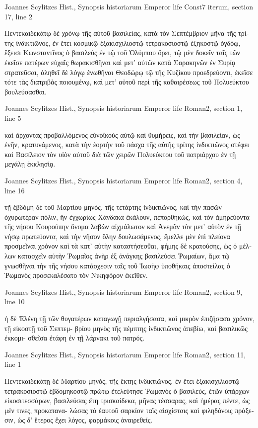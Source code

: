 \documentclass[12pt,letterpaper,twoside,final]{memoir}
\begin{document}
\begin{greek}
Joannes Scylitzes Hist., Synopsis historiarum 
Emperor life Const7 iterum, section 17, line 2

Πεντεκαιδεκάτῳ δὲ χρόνῳ τῆς αὐτοῦ βασιλείας, κατὰ τὸν 
Σεπτέμβριον μῆνα τῆς τρίτης ἰνδικτιῶνος, ἐν ἔτει κοσμικῷ ἑξακισχιλιοστῷ   
τετρακοσιοστῷ ἑξηκοστῷ ὀγδόῳ, ἔξεισι Κωνσταντῖνος ὁ βασιλεὺς ἐν 
τῷ τοῦ Ὀλύμπου ὄρει, τῷ μὲν δοκεῖν ταῖς τῶν ἐκεῖσε πατέρων εὐχαῖς 
θωρακισθῆναι καὶ μετ' αὐτῶν κατὰ Σαρακηνῶν ἐν Συρίᾳ στρατεῦσαι, 
ἀληθεῖ δὲ λόγῳ ἑνωθῆναι Θεοδώρῳ τῷ τῆς Κυζίκου προεδρεύοντι, 
ἐκεῖσε τότε τὰς διατριβὰς ποιουμένῳ, καὶ μετ' αὐτοῦ περὶ τῆς καθαιρέσεως 
τοῦ Πολυεύκτου βουλεύσασθαι. 



Joannes Scylitzes Hist., Synopsis historiarum 
Emperor life Roman2, section 1, line 5

καὶ ἄρχοντας προβαλλόμενος εὐνοϊκοὺς αὐτῷ καὶ θυμήρεις, καὶ τὴν 
βασιλείαν, ὡς ἐνῆν, κρατυνάμενος, κατὰ τὴν ἑορτὴν τοῦ πάσχα τῆς αὐτῆς 
τρίτης ἰνδικτιῶνος στέφει καὶ Βασίλειον τὸν υἱὸν αὐτοῦ διὰ τῶν χειρῶν 
Πολυεύκτου τοῦ πατριάρχου ἐν τῇ μεγάλῃ ἐκκλησίᾳ. 



Joannes Scylitzes Hist., Synopsis historiarum 
Emperor life Roman2, section 4, line 16

              τῇ ἑβδόμῃ δὲ τοῦ Μαρτίου μηνός, τῆς τετάρτης ἰνδικτιῶνος, 
καὶ τὴν πασῶν ὀχυρωτέραν πόλιν, ἣν ἐγχωρίως Χάνδακα ἐκάλουν, 
πεπορθηκώς, καὶ τὸν ἀμηρεύοντα τῆς νήσου Κουρούπην ὄνομα λαβὼν   
αἰχμάλωτον καὶ Ἀνεμᾶν τὸν μετ' αὐτὸν ἐν τῇ νήσῳ πρωτεύοντα, καὶ τὴν 
νῆσον ὅλην δουλωσάμενος, ἔμελλε μὲν ἐπὶ πλείονα προσμεῖναι χρόνον καὶ 
τὰ κατ' αὐτὴν καταστήσεσθαι, φήμης δὲ κρατούσης, ὡς ὁ μέλλων 
κατασχεῖν αὐτὴν Ῥωμαῖος ἀνὴρ ἐξ ἀνάγκης βασιλεύσει Ῥωμαίων, ἅμα 
τῷ γνωσθῆναι τὴν τῆς νήσου κατάσχεσιν ταῖς τοῦ Ἰωσὴφ ὑποθήκαις 
ἀποστείλας ὁ Ῥωμανὸς προσεκαλέσατο τὸν Νικηφόρον ἐκεῖθεν. 



Joannes Scylitzes Hist., Synopsis historiarum 
Emperor life Roman2, section 9, line 10

                              ἡ δὲ Ἑλένη τῇ τῶν θυγατέρων καταγωγῇ 
περιαλγήσασα, καὶ μικρὸν ἐπιζήσασα χρόνον, τῇ εἰκοστῇ τοῦ Σεπτεμ-
βρίου μηνὸς τῆς πέμπτης ἰνδικτιῶνος ἀπεβίω, καὶ βασιλικῶς ἐκκομι-
σθεῖσα ἐτάφη ἐν τῇ λάρνακι τοῦ πατρός. 



Joannes Scylitzes Hist., Synopsis historiarum 
Emperor life Roman2, section 11, line 1

Πεντεκαιδεκάτῃ δὲ Μαρτίου μηνός, τῆς ἕκτης ἰνδικτιῶνος, ἐν 
ἔτει ἑξακισχιλιοστῷ τετρακοσιοστῷ ἑβδομηκοστῷ πρώτῳ ἐτελεύτησε 
Ῥωμανὸς ὁ βασιλεύς, ἐτῶν ὑπάρχων εἰκοσιτεσσάρων, βασιλεύσας ἔτη 
τρισκαίδεκα, μῆνας τέσσαρας, καὶ ἡμέρας πέντε, ὡς μέν τινες, προκατανα-
λώσας τὸ ἑαυτοῦ σαρκίον ταῖς αἰσχίσταις καὶ φιληδόνοις πράξεσιν, ὡς 
δ' ἕτερος ἔχει λόγος, φαρμάκοις ἀναιρεθείς. 




\end{greek}
\end{document}
